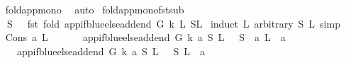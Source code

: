 \begin{isabellebody}
%
\isadelimproof
\ \ %
\endisadelimproof
%
\isatagproof
{}\isamarkupfalse%
\ fold{\isacharunderscore}{\kern0pt}app{\isacharunderscore}{\kern0pt}mono\ \isamarkupfalse%
\ auto%
\endisatagproof
{\isafoldproof}%
%
\isadelimproof
\isanewline
%
\endisadelimproof
\isanewline
{}\isamarkupfalse%
\ fold{\isacharunderscore}{\kern0pt}app{\isacharunderscore}{\kern0pt}mono{\isacharunderscore}{\kern0pt}fst{\isacharunderscore}{\kern0pt}sub{\isacharcolon}{\kern0pt}\ \isanewline
\ \ \ {\isachardoublequoteopen}\ S\ {\isasymsubseteq}\ \ {\isacharparenleft}{\kern0pt}fst\ {\isacharparenleft}{\kern0pt}fold\ {\isacharparenleft}{\kern0pt}app{\isacharunderscore}{\kern0pt}if{\isacharunderscore}{\kern0pt}blue{\isacharunderscore}{\kern0pt}else{\isacharunderscore}{\kern0pt}add{\isacharunderscore}{\kern0pt}end\ G\ k{\isacharparenright}{\kern0pt}\ L{}\ {\isacharparenleft}{\kern0pt}S{\isacharcomma}{\kern0pt}L{}{\isacharparenright}{\kern0pt}{\isacharparenright}{\kern0pt}{\isacharparenright}{\kern0pt}{\isachardoublequoteclose}\ \isanewline
%
\isadelimproof
%
\endisadelimproof
%
\isatagproof
{}\isamarkupfalse%
{\isacharparenleft}{\kern0pt}induct\ L{}\ arbitrary{\isacharcolon}{\kern0pt}\ S\ L{}{\isacharcomma}{\kern0pt}\ simp{\isacharparenright}{\kern0pt}\isanewline
\ \ \isamarkupfalse%
\ {\isacharparenleft}{\kern0pt}Cons\ a\ L{}{\isacharparenright}{\kern0pt}\isanewline
\ \ \isamarkupfalse%
\ \isamarkupfalse%
\ {\isachardoublequoteopen}\ {\isacharparenleft}{\kern0pt}app{\isacharunderscore}{\kern0pt}if{\isacharunderscore}{\kern0pt}blue{\isacharunderscore}{\kern0pt}else{\isacharunderscore}{\kern0pt}add{\isacharunderscore}{\kern0pt}end\ G\ k\ a\ {\isacharparenleft}{\kern0pt}S{\isacharcomma}{\kern0pt}\ L{}{\isacharparenright}{\kern0pt}{\isacharparenright}{\kern0pt}\ {\isacharequal}{\kern0pt}\ \ {\isacharparenleft}{\kern0pt}S\ {\isasymunion}\ {\isacharbraceleft}{\kern0pt}a{\isacharbraceright}{\kern0pt}{\isacharcomma}{\kern0pt}\ L{}\ {\isacharat}{\kern0pt}\ {\isacharbrackleft}{\kern0pt}a{\isacharbrackright}{\kern0pt}{\isacharparenright}{\kern0pt}{\isachardoublequoteclose}\isanewline
\ \ \ \ {\isacharbar}{\kern0pt}\ \ {\isachardoublequoteopen}{\isacharparenleft}{\kern0pt}app{\isacharunderscore}{\kern0pt}if{\isacharunderscore}{\kern0pt}blue{\isacharunderscore}{\kern0pt}else{\isacharunderscore}{\kern0pt}add{\isacharunderscore}{\kern0pt}end\ G\ k\ a\ {\isacharparenleft}{\kern0pt}S{\isacharcomma}{\kern0pt}\ L{}{\isacharparenright}{\kern0pt}{\isacharparenright}{\kern0pt}\ {\isacharequal}{\kern0pt}\ \ {\isacharparenleft}{\kern0pt}S{\isacharcomma}{\kern0pt}\ L{}\ {\isacharat}{\kern0pt}\ {\isacharbrackleft}{\kern0pt}a{\isacharbrackright}{\kern0pt}{\isacharparenright}{\kern0pt}{\isachardoublequoteclose}\isanewline

\end{isabellebody}

